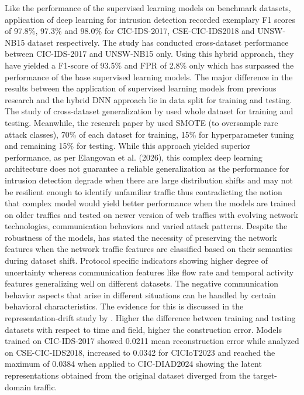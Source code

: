 Like the performance of the supervised learning models on benchmark datasets, application of deep learning for intrusion detection recorded exemplary F1 scores 
of 97.8\%, 97.3\% and 98.0\% for CIC-IDS-2017, CSE-CIC-IDS2018 and UNSW-NB15 dataset respectively. The study has conducted cross-dataset performance between CIC-IDS-2017 
and UNSW-NB15 only. Using this hybrid approach, they have yielded a F1-score of 93.5\% and FPR of 2.8\% only which has surpassed the performance of the base supervised 
learning models. The major difference in the results between the application of supervised learning models from previous research and the hybrid DNN approach lie in 
data split for training and testing. The study of cross-dataset generalization by \cite{Cantone2024} used whole dataset for training and testing. Meanwhile, 
the research paper by \cite{Chandra2025} used SMOTE (to oversample rare attack classes), 70\% of each dataset for training, 15\% for hyperparameter tuning and remaining 15\% 
for testing. While this approach yielded superior performance, as per Elangovan et al. (2026), this complex deep learning architecture does not guarantee a reliable 
generalization as the performance for intrusion detection degrade when there are large distribution shifts and may not be resilient enough to identify unfamiliar traffic 
thus contradicting the notion that complex model would yield better performance when the models are trained on older traffics and tested on newer version of web traffics 
with evolving network technologies, communication behaviors and varied attack patterns. Despite the robustness of the models, \cite{Elangovan2026} has stated the necessity 
of preserving the network features when the network traffic features are classified based on their semantics during dataset shift. Protocol specific indicators showing 
higher degree of uncertainty whereas communication features like flow rate and temporal activity features generalizing well on different datasets. The negative communication 
behavior aspects that arise in different situations can be handled by certain behavioral characteristics. The evidence for this is discussed in the representation-drift 
study by \cite{Elangovan2026}. Higher the difference between training and testing datasets with respect to time and field, higher the construction error. Models trained 
on CIC-IDS-2017 showed 0.0211 mean reconstruction error while analyzed on CSE-CIC-IDS2018, increased to 0.0342 for CICIoT2023 and reached the maximum of 0.0384 when 
applied to CIC-DIAD2024 showing the latent representations obtained from the original dataset diverged from the target-domain traffic.

